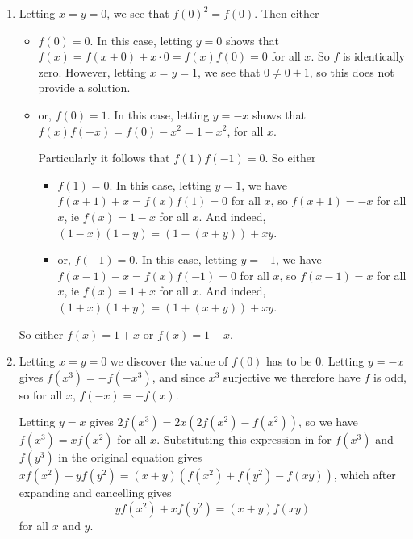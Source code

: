 \documentclass[a4paper,12pt,fleqn]{article}
\begin{document}
\begin{enumerate}
 \item

  Letting \(x = y = 0\), we see that \(f(0)^2 = f(0)\). Then either
  \begin{itemize}
   \item
    \(f(0) = 0\). In this case, letting \(y = 0\) shows that
    \(f(x) = f(x + 0) + x \cdot 0 =  f(x)f(0) = 0\) for all \(x\). So \(f\) is
    identically zero. However, letting \(x = y = 1\), we see that
    \(0 \ne 0 + 1\), so this does not provide a solution.
   \item
    or, \(f(0) = 1\). In this case, letting \(y = -x\) shows that
    \(f(x)f(-x) = f(0) - x^2 = 1 - x^2\), for all \(x\).

    Particularly it follows that \(f(1) f(-1) = 0\). So either
    \begin{itemize}
     \item
      \(f(1) = 0\). In this case, letting \(y = 1\), we have
      \(f(x + 1) + x = f(x) f(1) = 0\) for all \(x\), so
      \(f(x + 1) = -x\) for all \(x\), ie \(f(x) = 1 - x\) for all \(x\). And
      indeed, \((1 - x)(1 - y) = (1 - (x + y)) + xy\).
     \item
      or, \(f(-1) = 0\). In this case, letting \(y = -1\), we have
      \(f(x - 1) - x = f(x) f(-1) = 0\) for all \(x\), so
      \(f(x - 1) = x\) for all \(x\), ie \(f(x) = 1 + x\) for all \(x\). And
      indeed, \((1 + x)(1 + y) = (1 + (x + y)) + xy\).
    \end{itemize}
  \end{itemize}
  So either \(f(x) = 1 + x\) or \(f(x) = 1 - x\).
 \item

  Letting \(x = y = 0\) we discover the value of \(f(0)\) has to be \(0\).
  Letting \(y = -x\) gives \(f(x^3) = -f(-x^3)\), and since \(x^3\) surjective
  we therefore have \(f\) is odd, so for all \(x\), \(f(-x) = -f(x)\).

  Letting \(y = x\) gives \(2f(x^3) = 2x(2f(x^2) - f(x^2))\), so we have
  \(f(x^3) = xf(x^2)\) for all \(x\). Substituting this expression in for
  \(f(x^3)\) and \(f(y^3)\) in the original equation gives
  \(xf(x^2) + yf(y^2) = (x + y)(f(x^2) + f(y^2) - f(xy))\), which after
  expanding and cancelling gives
  \begin{equation} \label{eq_2}
   yf(x^2) + xf(y^2) = (x + y)f(xy)
  \end{equation}
  for all \(x\) and \(y\).


\end{enumerate}
\end{document}

